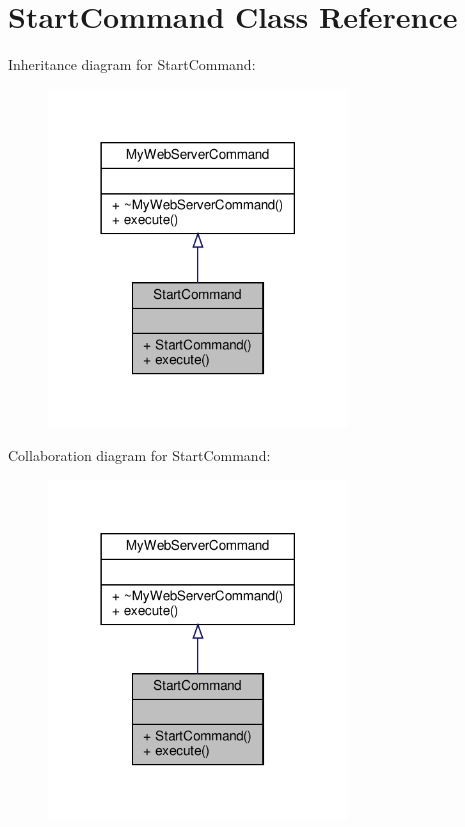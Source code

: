 \hypertarget{classStartCommand}{}\section{Start\+Command Class Reference}
\label{classStartCommand}


Inheritance diagram for Start\+Command\+:\nopagebreak
\begin{figure}[H]
\begin{center}
\leavevmode
\includegraphics[width=225pt]{classStartCommand__inherit__graph}
\end{center}
\end{figure}


Collaboration diagram for Start\+Command\+:\nopagebreak
\begin{figure}[H]
\begin{center}
\leavevmode
\includegraphics[width=225pt]{classStartCommand__coll__graph}
\end{center}
\end{figure}
